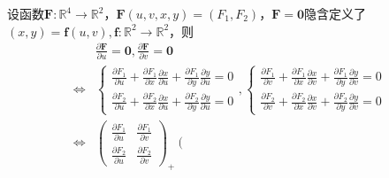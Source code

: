 \documentclass[main.tex]{subfiles}
\begin{document}
\begin{example}\label{exp:II.12.2}
    设函数$\mathbf{F}:\mathbb{R}^4\rightarrow\mathbb{R}^2$，$\mathbf{F}\left(u,v,x,y\right)=\left(F_1,F_2\right)$，$\mathbf{F}=\mathbf{0}$隐含定义了$\left(x,y\right)=\mathbf{f}\left(u,v\right),\mathbf{f}:\mathbb{R}^2\rightarrow\mathbb{R}^2$，则
    \begin{align*}
                        & \frac{\partial \mathbf{F}}{\partial u}=\mathbf{0},\frac{\partial \mathbf{F}}{\partial v}=\mathbf{0}                                                                                                                                                                                                                                                                                                                                                                              \\
        \Leftrightarrow & \left\{\begin{array}{l}
                                     \frac{\partial F_1}{\partial u}+\frac{\partial F_1}{\partial x}\frac{\partial x}{\partial u}+\frac{\partial F_1}{\partial y}\frac{\partial y}{\partial u}=0 \\
                                     \frac{\partial F_2}{\partial u}+\frac{\partial F_2}{\partial x}\frac{\partial x}{\partial u}+\frac{\partial F_2}{\partial y}\frac{\partial y}{\partial u}=0
                                 \end{array}\right.,\left\{\begin{array}{l}
                                                               \frac{\partial F_1}{\partial v}+\frac{\partial F_1}{\partial x}\frac{\partial x}{\partial v}+\frac{\partial F_1}{\partial y}\frac{\partial y}{\partial v}=0 \\
                                                               \frac{\partial F_2}{\partial v}+\frac{\partial F_2}{\partial x}\frac{\partial x}{\partial v}+\frac{\partial F_2}{\partial y}\frac{\partial y}{\partial v}=0
                                                           \end{array}\right.                                                                                                                                                                                                                                                                                     \\
        \Leftrightarrow & \left(\begin{array}{cc}
                                        \frac{\partial F_1}{\partial u} & \frac{\partial F_1}{\partial v} \\\frac{\partial F_2}{\partial u}&\frac{\partial F_2}{\partial v}\end{array}\right)_+\left(\begin{array}{cc}

\end{array}
\end{align*}
\end{example}
\end{document}
